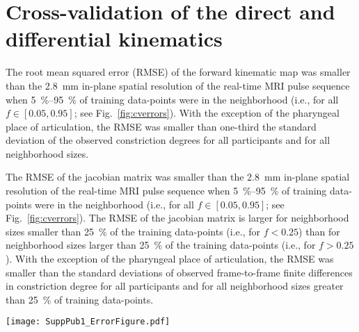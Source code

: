 \documentclass[reprint]{JASAnew}\usepackage[]{graphicx}\usepackage[]{color}
\begin{document}
\section{Cross-validation of the direct and differential kinematics}
\label{sec:crossvalidation}

The root mean squared error (RMSE) of the forward kinematic map was smaller than the \SI{2.8}{\milli\meter} in-plane spatial resolution of the real-time MRI pulse sequence when \SIrange{5}{95}{\percent} of training data-points were in the neighborhood (i.e., for all $f\in \left[ 0.05, 0.95\right]$; see Fig.~\ref{fig:cverrors}). With the exception of the pharyngeal place of articulation, the RMSE was smaller than one-third the standard deviation of the observed constriction degrees for all participants and for all neighborhood sizes.

The RMSE of the jacobian matrix was smaller than the \SI{2.8}{\milli\meter} in-plane spatial resolution of the real-time MRI pulse sequence when \SIrange{5}{95}{\percent} of training data-points were in the neighborhood (i.e., for all $f\in \left[ 0.05, 0.95\right]$; see Fig.~\ref{fig:cverrors}).
%
The RMSE of the jacobian matrix is larger for neighborhood sizes smaller than \SI{25}{\percent} of the training data-points (i.e., for $f<0.25$) than for neighborhood sizes larger than \SI{25}{\percent} of the training data-points (i.e., for $f>0.25$). 
%
With the exception of the pharyngeal place of articulation, the RMSE was smaller than the standard deviations of observed frame-to-frame finite differences in constriction degree for all participants and for all neighborhood sizes greater than \SI{25}{\percent} of training data-points. 

\begin{figure*}
\raggedright
\texttt{[image: SuppPub1\_ErrorFigure.pdf]}
\caption{
{\bf (a)} Root mean squared error (RMSE) of the forward kinematic map estimator of constriction degrees and {\bf (b)} RMSE of the jacobian matrix estimator of frame-to-frame finite differences in constriction degrees. 
Data-points are the median RMSE computed over all 10 folds of cross-validation.
Lines connect the RMSE values of a single participant at different neighborhood sizes ($X$-axis).
Neighborhood size is given as percentage of training data-points.
The standard deviations of observed (frame-to-frame finite differences in) constriction degrees are indicated as tick marks on the right $Y$-axis for each participant whenever the standard deviations are small enough to fit within the $Y$-axis limits.}
\label{fig:cverrors}
\end{figure*}
\end{document}
